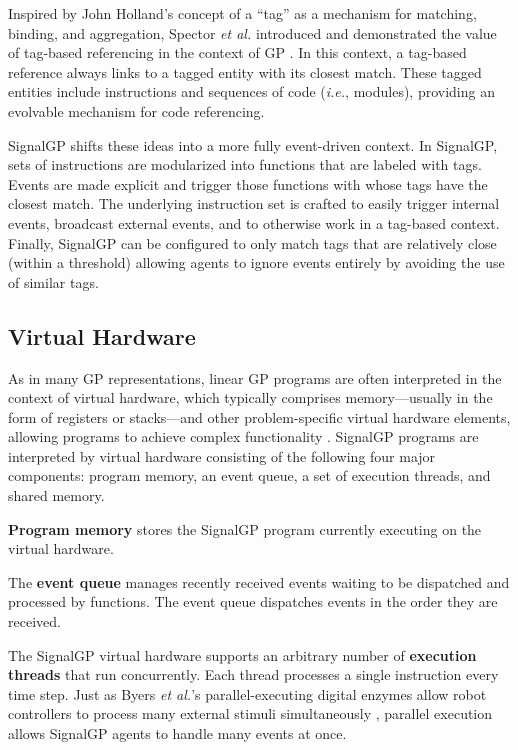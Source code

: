 Inspired by John Holland's concept of a ``tag'' \citep{holland_effect_1993,holland_genetic_1987,holland_concerning_1990,holland_studying_2006} as a mechanism for matching, binding, and aggregation, Spector \textit{et al.} introduced and demonstrated the value of tag-based referencing in the context of GP \citep{spector_tag-based_2011,spector_whats_2011,spector_tag-based_2012}. 
In this context, a tag-based reference always links to a tagged entity with its closest match. 
These tagged entities include instructions and sequences of code (\textit{i.e.}, modules), providing an evolvable mechanism for code referencing. 

SignalGP shifts these ideas into a more fully event-driven context.
In SignalGP, sets of instructions are modularized into functions that are labeled with tags. Events are made explicit and trigger those functions with whose tags have the closest match.
The underlying instruction set is crafted to easily trigger internal events, broadcast external events, and to otherwise work in a tag-based context. 
Finally, SignalGP can be configured to only match tags that are relatively close (within a threshold) allowing agents to ignore events entirely by avoiding the use of similar tags.

\subsection{Virtual Hardware} 

As in many GP representations, linear GP programs are often interpreted in the context of virtual hardware, which typically comprises memory---usually in the form of registers or stacks---and other problem-specific virtual hardware elements, allowing programs to achieve complex functionality \citep{mcdermott_genetic_2015,poli_field_2008,ofria_avida:_2009}. 
SignalGP programs are interpreted by virtual hardware consisting of the following four major components: program memory, an event queue, a set of execution threads, and shared memory.

\textbf{Program memory} stores the SignalGP program currently executing on the virtual hardware.

The \textbf{event queue} manages recently received events waiting to be dispatched and processed by functions. The event queue dispatches events in the order they are received. 

The SignalGP virtual hardware supports an arbitrary number of \textbf{execution threads} that run concurrently. 
Each thread processes a single instruction every time step. 
Just as Byers \textit{et al.}'s parallel-executing digital enzymes allow robot controllers to process many external stimuli simultaneously \citep{byers_digital_2011}, parallel execution allows SignalGP agents to handle many events at once.

